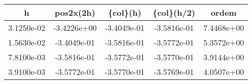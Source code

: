 \begin{table}[htb]
    \centering
    \begin{tabular}{@{}ccccc@{}}
        \toprule
        h & pos2x(2h) & \{col\}(h) & \{col\}(h/2) & ordem \\ \hline
        \midrule
        3.1250e-02 & -3.4226e+00 & -3.4049e-01 & -3.5816e-01 & 7.4468e+00 \\ \hline
        1.5630e-02 & -3.4049e-01 & -3.5816e-01 & -3.5772e-01 & 5.3572e+00 \\ \hline
        7.8100e-03 & -3.5816e-01 & -3.5772e-01 & -3.5770e-01 & 3.9144e+00 \\ \hline
        3.9100e-03 & -3.5772e-01 & -3.5770e-01 & -3.5769e-01 & 4.0507e+00 \\ \hline
        \bottomrule
    \end{tabular}
\end{table}
